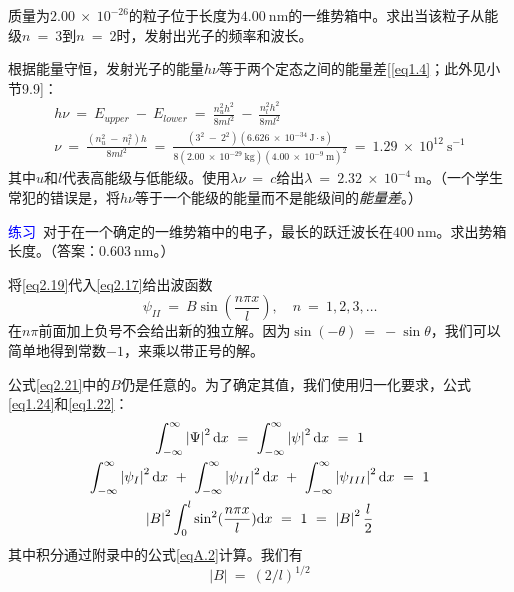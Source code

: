 \documentclass[12pt,a4paper,openany]{ctexbook}
\begin{document}
\begin{flushleft}
\begin{examplebox}
    \setlength{\parindent}{2em}
\noindent 质量为$2.00\ \times\ 10^{-26}$的粒子位于长度为$4.00\ \text{nm}$的一维势箱中。求出当该粒子从能级$n\ =\ 3$到$n\ =\ 2$时，发射出光子的频率和波长。

根据能量守恒，发射光子的能量$h\nu$等于两个定态之间的能量差[\eqref{eq1.4}；此外见小节9.9]：
\begin{gather*}
    h\nu\ =\ E_{upper}\ -\ E_{lower}\ =\ \frac{n_u^2h^2}{8ml^2}\ -\ \frac{n_l^2h^2}{8ml^2} \\
    \nu\ =\ \frac{(n_u^2\ -\ n_l^2)h}{8ml^2}\ =\ \frac{(3^2\ -\ 2^2)(6.626\ \times\ 10^{-34}\ \text{J}\cdot\text{s})}{8(2.00\ \times\ 10^{-29}\ \text{kg})(4.00\ \times\ 10^{-9}\ \text{m})^2}\ =\ 1.29\ \times\ 10^{12}\ \text{s}^{-1}
\end{gather*}
其中$u$和$l$代表高能级与低能级。使用$\lambda\nu\ =\ c$给出$\lambda\ =\ 2.32\ \times\ 10^{-4}\ \text{m}$。（一个学生常犯的错误是，将$h\nu$等于一个能级的能量而不是能级间的\textit{能量差}。）

\noindent \textcolor{blue}{\large 练习}\ 对于在一个确定的一维势箱中的电子，最长的跃迁波长在$400\ \text{nm}$。求出势箱长度。（答案：$0.603\ \text{nm}$。）
\end{examplebox}

将\eqref{eq2.19}代入\eqref{eq2.17}给出波函数
\begin{equation}
    \psi_{II}\ =\ B\sin(\frac{n\pi x}{l}),\quad n\ =\ 1,2,3,\dots
    \label{eq2.21}
\end{equation}
在$n\pi$前面加上负号不会给出新的独立解。因为$\sin(-\theta)\ =\ -\sin\theta$，我们可以简单地得到常数$-1$，来乘以带正号的解。

公式\eqref{eq2.21}中的$B$仍是任意的。为了确定其值，我们使用归一化要求，公式\eqref{eq1.24}和\eqref{eq1.22}：
\begin{gather}
    \int_{-\infty}^{\infty}\left|\Psi\right|^2\mathrm{d}x\ =\ \int_{-\infty}^{\infty}\left|\psi\right|^2\mathrm{d}x\ =\ 1 \notag \\
    \int_{-\infty}^{\infty}\left|\psi_I\right|^2\mathrm{d}x\ +\ \int_{-\infty}^{\infty}\left|\psi_{II}\right|^2\mathrm{d}x\ +\ \int_{-\infty}^{\infty}\left|\psi_{III}\right|^2\mathrm{d}x\ =\ 1 \notag \\
    \left|B\right|^2\int_0^l\sin^2(\frac{n\pi x}{l})\mathrm{d}x\ =\ 1\ =\ \left|B\right|^2\frac{l}{2}
    \label{eq2.22}
\end{gather}
其中积分通过附录中的公式\eqref{eqA.2}计算。我们有
\begin{equation*}
    \left|B\right|\ =\ (2/l)^{1/2}
\end{equation*}


\end{flushleft}
\end{document}
